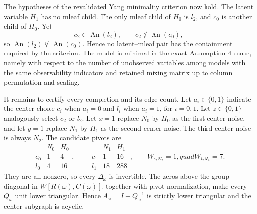 The hypotheses of the revalidated Yang minimality criterion now hold.  The latent variable \(H_1\) has no mleaf child.  The only mleaf child of \(H_0\) is \(l_2\), and \(c_0\) is another child of \(H_0\).  Yet
\[
c_2\in\operatorname{An}(l_2),\qquad c_2\notin\operatorname{An}(c_0),
\]
so \(\operatorname{An}(l_2)\nsubseteq\operatorname{An}(c_0)\).  Hence no latent--mleaf pair has the containment required by the criterion.  The model is minimal in the exact Assumption 4 sense, namely with respect to the number of unobserved variables among models with the same observability indicators and retained mixing matrix up to column permutation and scaling.

It remains to certify every completion and its edge count.  Let \(a_i\in\{0,1\}\) indicate the center choice \(c_i\) when \(a_i=0\) and \(l_i\) when \(a_i=1\), for \(i=0,1\).  Let \(z\in\{0,1\}\) analogously select \(c_2\) or \(l_2\).  Let \(x=1\) replace \(N_0\) by \(H_0\) as the first center noise, and let \(y=1\) replace \(N_1\) by \(H_1\) as the second center noise.  The third center noise is always \(N_2\).  The candidate pivots are
\[
\begin{array}{c|cc}
&N_0&H_0\\ \hline
c_0&1&4\\
l_0&4&16
\end{array},\qquad
\begin{array}{c|cc}
&N_1&H_1\\ \hline
c_1&1&16\\
l_1&18&288
\end{array},\qquad
W_{c_2N_2}=1,quad W_{l_2N_2}=7.
\]
They are all nonzero, so every \(\Delta_\omega\) is invertible.  The zeros above the group diagonal in \(W[R(\omega),C(\omega)]\), together with pivot normalization, make every \(Q_\omega\) unit lower triangular.  Hence \(A_\omega=I-Q_\omega^{-1}\) is strictly lower triangular and the center subgraph is acyclic.

